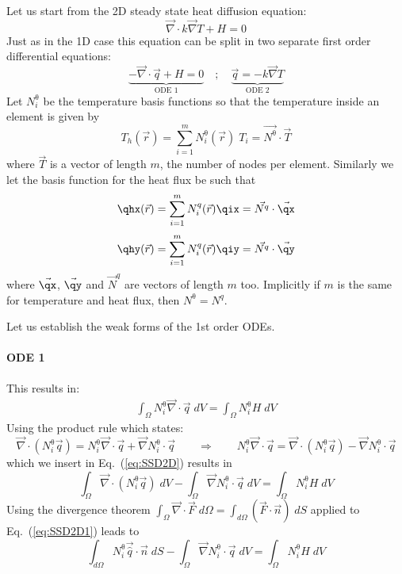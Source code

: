 
Let us start from the 2D steady state heat diffusion equation:
\begin{equation}
    \vec{\nabla} \cdot k \vec{\nabla} T + H=0
\end{equation}
Just as in the 1D case this equation can be split in two separate first order differential equations:
\begin{equation}
    \underbrace{-\vec{\nabla}\cdot \vec{q} + H=0}_{\text{ODE 1}} \quad ; \quad \underbrace{\vec{q}=-k\vec{\nabla } T}_{\text{ODE 2}}
\end{equation}
Let $N^\uptheta_i$ be the temperature basis functions so that the temperature inside an element is given by
\begin{equation}
T_h (\vec{r}) = \sum_{i=1}^m N_i^\uptheta (\vec{r}) \; T_i = \vec{N^\uptheta}\cdot \vec{T}
\end{equation}
where $\vec{T}$ is a vector of length $m$, the number of nodes per element. 
Similarly we let the basis function for the heat flux be such that 
\begin{equation}
\qhx(\vec{r}) = \sum_{i=1}^m N_i^q (\vec r) \qix = \vec{N^q}\cdot \vec{\qx}
\end{equation}
\begin{equation}
\qhy(\vec{r}) = \sum_{i=1}^m N_i^q (\vec r) \qiy = \vec{N^q}\cdot \vec{\qy}
\end{equation}
where $\vec{\qx}$, $\vec{\qy}$ and $\vec{N}^q$ 
are vectors of length $m$ too. Implicitly if $m$ is the same for temperature and heat flux, then $N^\uptheta = N^q$.

Let us establish the weak forms of the 1st order ODEs. 


\paragraph{ODE 1} This results in:
\begin{eqnarray}
\int_\Omega {N^\uptheta_i} \vec{\nabla} \cdot \vec{q} \; dV = \int_\Omega {N^\uptheta_i} H \; dV
\label{eq:SSD2D}
\end{eqnarray}
Using the product rule which states:
\[
\vec{\nabla} \cdot ({N^\uptheta_i}\vec{q})={N^\uptheta_i}\vec{\nabla} \cdot \vec{q} 
+ \vec{\nabla}{N^\uptheta_i} \cdot \vec{q} 
\qquad
\Rightarrow
\qquad
{N^\uptheta_i}\vec{\nabla} \cdot \vec{q}=\vec{\nabla} \cdot ({N^\uptheta_i}\vec{q})- 
\vec{\nabla}{N^\uptheta_i} \cdot \vec{q}
\]
which we insert in Eq.~(\ref{eq:SSD2D}) results in 
\begin{equation}
\int_{\Omega} \vec{\nabla} \cdot ({N^\uptheta_i} \vec{q}) \; dV - 
\int_{\Omega} \vec{\nabla} {N^\uptheta_i} \cdot \vec{q} \; dV = \int_{\Omega} {N^\uptheta_i} H \; dV
\label{eq:SSD2D1}
\end{equation}
Using the divergence theorem 
$\int_\Omega \vec{\nabla} \cdot \vec{F} \; d\Omega = \int_{d\Omega}(\vec{F} \cdot \vec{n}) \; dS$ 
 applied to Eq.~(\ref{eq:SSD2D1}) leads to
\begin{equation}
\int_{d\Omega}{N^\uptheta_i} \vec{\hat{q}} \cdot \vec{n} \; dS  - 
\int_{\Omega} \vec{\nabla} {N^\uptheta_i} \cdot \vec{q} \; dV = 
\int_{\Omega} {N^\uptheta_i} H  \; dV
\end{equation}

